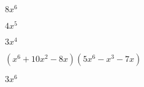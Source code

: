\documentclass{article}
\begin{document}
\begin{multicols}{2}
$8x^{6}$\item $4x^{5}$\item $3x^{4}$\item $(x^{6}+10x^2-8x)(5x^{6}-x^{3}-7x)$\item $3x^{6}$\ite
\end{multicols}
\end{document}
